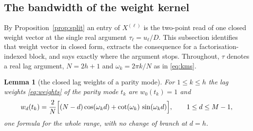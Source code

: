 \documentclass[11pt,a4paper]{article}
\theoremstyle{plain}
\newtheorem{lemma}[theorem]{Lemma}
\theoremstyle{definition}
\begin{document}
\subsection{The bandwidth of the weight kernel}
\label{sec:band}

By Proposition~\ref{prop:split} an entry of $X^{(\ell)}$ is the two-point read
of one closed weight vector at the single real argument $\tau_\ell=u_\ell/D$.
This subsection identifies that weight vector in closed form, extracts the
consequence for a factorisation-indexed block, and says exactly where the
argument stops. Throughout, $\tau$ denotes a real lag argument, $N=2h+1$ and
$\omega_k=2\pi k/N$ as in \eqref{eq:kms}.

\begin{lemma}[the closed lag weights of a parity mode]
\label{lem:closedweight}
For $1\le k\le h$ the lag weights \eqref{eq:weights} of the parity mode $t_k$
are $w_0(t_k)=1$ and
\begin{equation}
\label{eq:closedweight}
  w_d(t_k)
  =\frac2N\Bigl[(N-d)\cos(\omega_kd)+\cot(\omega_k)\,\sin(\omega_kd)\Bigr],
  \qquad 1\le d\le M-1 ,
\end{equation}
one formula for the whole range, with no change of branch at $d=h$.
\end{lemma}
\end{document}

